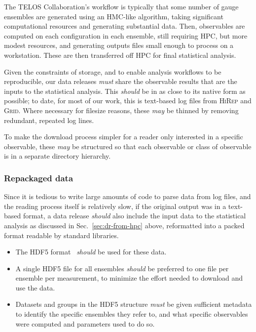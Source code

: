\documentclass{article}
\newcommand\rfcword[1]{\emph{#1}\xspace}
\newcommand\must{\rfcword{must}}
\newcommand\should{\rfcword{should}}
\newcommand\may{\rfcword{may}}
\newcommand\program[1]{\textsc{#1}\xspace}
\begin{document}
The TELOS Collaboration's workflow is typically that
some number of gauge ensembles are generated using an HMC-like algorithm,
taking significant computational resources
and generating substantial data.
Then,
observables are computed on each configuration in each ensemble,
still requiring HPC,
but more modest resources,
and generating outputs files small enough to process on a workstation.
These are then transferred off HPC for final statistical analysis.

Given the constraints of storage,
and to enable analysis workflows to be reproducible,
our data releases \must
share the observable results that are the inputs to the statistical analysis.
This \should be in as close to its native form as possible;
to date,
for most of our work,
this is text-based log files from \program{HiRep} and \program{Grid}.
Where necessary for filesize reasons,
these \may be thinned by removing redundant, repeated log lines.

To make the download process simpler for a reader only interested in a specific observable,
these \may be structured so that
each observable or class of observable
is in a separate directory hierarchy.


\subsubsection{Repackaged data}

Since it is tedious to write large amounts of code to parse data from log files,
and the reading process itself is relatively slow,
if the original output was in a text-based format,
a data release \should also include the input data to the statistical analysis
as discussed in Sec.~\ref{sec:dr-from-hpc} above,
reformatted into a packed format readable by standard libraries.

\begin{itemize}
  \item
        The HDF5 format~\cite{hdf5} \should be used for these data.
  \item
        A single HDF5 file for all ensembles \should be preferred
        to one file per ensemble per measurement,
        to minimize the effort needed to download and use the data.
  \item
        Datasets and groups in the HDF5 structure \must be given
        sufficient metadata to identify the specific ensembles they refer to,
        and what specific observables were computed and parameters used to do so.
\end{itemize}
\end{document}
